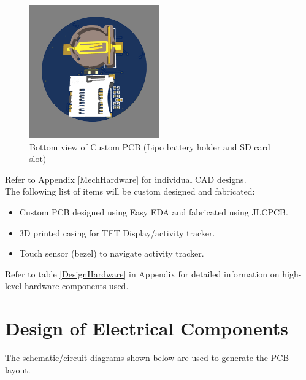 \documentclass[12pt, titlepage]{article}
\begin{document}
\begin{figure}[H]
	\begin{center}
		 \includegraphics[width=0.5\textwidth]{PCBBOTTOM}
		\caption{Bottom view of Custom PCB (Lipo battery holder and SD card slot)}
		\label{PCBBOTTOM} 
	\end{center}
\end{figure}

Refer to Appendix \ref{MechHardware} for individual CAD designs.\\

The following list of items will be custom designed and fabricated:
\begin{itemize}
\item{Custom PCB designed using Easy EDA and fabricated using JLCPCB.}
\item{3D printed casing for TFT Display/activity tracker.}
\item{Touch sensor (bezel) to navigate activity tracker.}
\end{itemize}

Refer to table \ref{DesignHardware} in Appendix for detailed information on high-level hardware components used.

\section{Design of Electrical Components}

The schematic/circuit diagrams shown below are used to generate the PCB layout.
\end{document}
